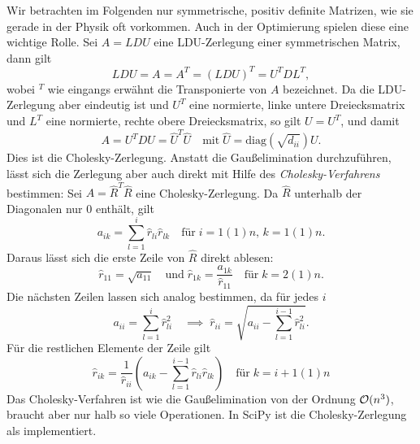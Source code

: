 Wir betrachten im Folgenden nur symmetrische, positiv definite
Matrizen, wie sie gerade in der Physik oft vorkommen. Auch in der
Optimierung spielen diese eine wichtige Rolle. Sei $A=LDU$ eine
LDU-Zerlegung einer symmetrischen Matrix, dann gilt
\begin{equation}
  LDU = A = A^T = (LDU)^T = U^T D L^T,
\end{equation}
wobei $^T$ wie eingangs erwähnt die Transponierte von $A$ bezeichnet.
Da die LDU-Zerlegung aber eindeutig ist und $U^T$ eine normierte,
linke untere Dreiecksmatrix und $L^T$ eine normierte, rechte obere
Dreiecksmatrix, so gilt $U=U^T$, und damit
\begin{equation}
  A = U^TDU = \widehat{U}^T\widehat{U} \quad\text{mit}\; \widehat{U}=\text{diag}(\sqrt{d_{ii}})U.
\end{equation}
Dies ist die Cholesky-Zerlegung. Anstatt die Gaußelimination
durchzuführen, lässt sich die Zerlegung aber auch direkt mit Hilfe des
\emph{Cholesky-Verfahrens} bestimmen: Sei
$A=\widehat{R}^T\widehat{R}$ eine Cholesky-Zerlegung.
Da $\widehat{R}$ unterhalb der Diagonalen nur 0 enthält, gilt
\begin{equation}
  a_{ik} = \sum_{l=1}^{i} \hat{r}_{li}\hat{r}_{lk} \quad\text{für}\;
  i=1(1)n,\,k=1(1)n.
\end{equation}
Daraus lässt sich die erste Zeile von $\widehat{R}$ direkt ablesen:
\begin{equation}
\hat{r}_{11} = \sqrt{a_{11}}\quad\text{und}\;
\hat{r}_{1k} = \frac{a_{1k}}{\hat{r}_{11}} \quad\text{für}\;k=2(1)n.
\end{equation}
Die nächsten Zeilen lassen sich analog bestimmen, da für jedes $i$
\begin{equation}
  a_{ii} = \sum_{l=1}^{i} \hat{r}_{li}^2\quad\implies\;
  \hat{r}_{ii} = \sqrt{a_{ii} - \sum_{l=1}^{i-1} \hat{r}_{li}^2}.
\end{equation}
Für die restlichen Elemente der Zeile gilt
\begin{equation}
  \hat{r}_{ik} = \frac{1}{\hat{r}_{ii}}\left(a_{ik} - \sum_{l=1}^{i-1}\hat{r}_{li}\hat{r}_{lk}\right) \quad\text{für}\;k=i+1(1)n
\end{equation}
Das Cholesky-Verfahren ist wie die Gaußelimination von der Ordnung
$\mathcal O(n^3)$, braucht aber nur halb so viele Operationen. In SciPy ist die
Cholesky-Zerlegung als  implementiert.

\section{}

